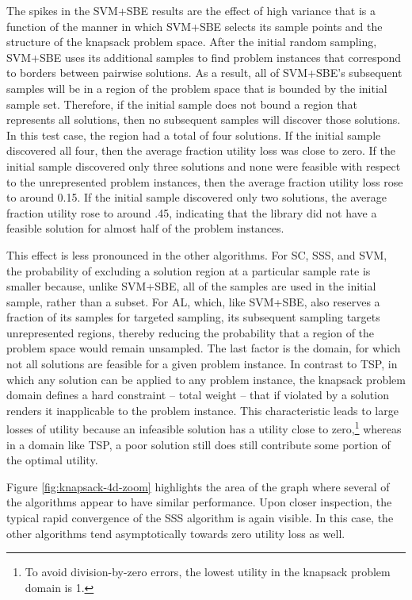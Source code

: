 The spikes in the SVM+SBE results are the effect of high variance that is a function of the manner in which SVM+SBE selects its sample points and the structure of the knapsack problem space.  After the initial random sampling, SVM+SBE uses its additional samples to find problem instances that correspond to borders between pairwise solutions. As a result, all of SVM+SBE's subsequent samples will be in a region of the problem space that is bounded by the initial sample set.  Therefore, if the initial sample does not bound a region that represents all solutions, then no subsequent samples will discover those solutions.  In this test case, the region had a total of four solutions.  If the initial sample discovered all four, then the average fraction utility loss was close to zero.  If the initial sample discovered only three solutions and none were feasible with respect to the unrepresented problem instances, then the average fraction utility loss rose to around 0.15.  If the initial sample discovered only two solutions, the average fraction utility rose to around .45, indicating that the library did not have a feasible solution for almost half of the problem instances.

This effect is less pronounced in the other algorithms.  For SC, SSS, and SVM, the probability of excluding a solution region at a particular sample rate is smaller because, unlike SVM+SBE, all of the samples are used in the initial sample, rather than a subset.  For AL, which, like SVM+SBE, also reserves a fraction of its samples for targeted sampling, its subsequent sampling targets unrepresented regions, thereby reducing the probability that a region of the problem space would remain unsampled.  The last factor is the domain, for which not all solutions are feasible for a given problem instance.  In contrast to TSP, in which any solution can be applied to any problem instance, the knapsack problem domain defines a hard constraint -- total weight -- that if  violated by a solution renders it inapplicable to the problem instance.  This characteristic leads to large losses of utility because an infeasible solution has a utility close to zero,\footnote{To avoid division-by-zero errors, the lowest utility in the knapsack problem domain is 1.} whereas in a domain like  TSP, a poor solution still does still contribute some portion of the optimal utility.


Figure \ref{fig:knapsack-4d-zoom} highlights the area of the graph where several of the algorithms appear to have similar performance.  Upon closer inspection, the typical  rapid convergence of the SSS algorithm is again visible.  In this case, the other algorithms tend asymptotically towards zero utility loss as well.



